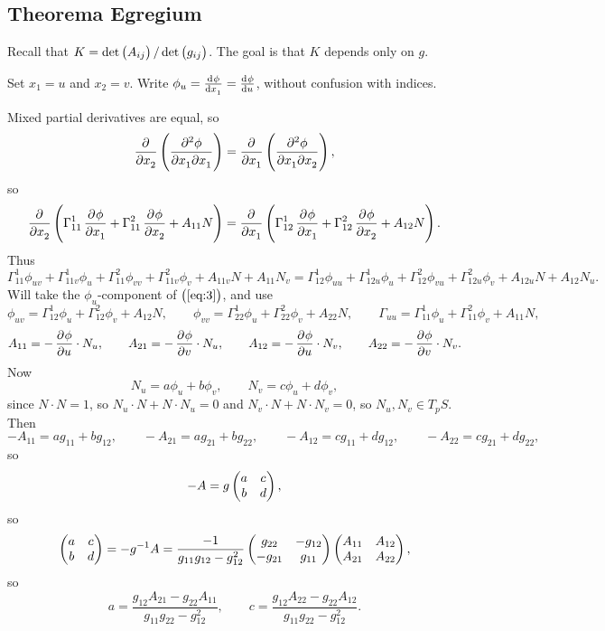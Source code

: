 \pagebreak

\subsection{Theorema Egregium}


Recall that $ K = \det\br{A_{ij}} / \det\br{g_{ij}} $. The goal is that $ K $ depends only on $ g $.

\begin{notation*}
Set $ x_1 = u $ and $ x_2 = v $. Write $ \phi_u = \tod{\phi}{x_1} = \tod{\phi}{u} $, without confusion with indices.
\end{notation*}

Mixed partial derivatives are equal, so
$$ \dpd{}{x_2}\br{\dmd{\phi}{2}{x_1}{}{x_1}{}} = \dpd{}{x_1}\br{\dmd{\phi}{2}{x_1}{}{x_2}{}}, $$
so
$$ \dpd{}{x_2}\br{\Gamma_{11}^1\dpd{\phi}{x_1} + \Gamma_{11}^2\dpd{\phi}{x_2} + A_{11}N} = \dpd{}{x_1}\br{\Gamma_{12}^1\dpd{\phi}{x_1} + \Gamma_{12}^2\dpd{\phi}{x_2} + A_{12}N}. $$
Thus
\begin{equation}
\label{eq:3}
\Gamma_{11}^1\phi_{uv} + \Gamma_{11v}^1\phi_u + \Gamma_{11}^2\phi_{vv} + \Gamma_{11v}^2\phi_v + A_{11v}N + A_{11}N_v = \Gamma_{12}^1\phi_{uu} + \Gamma_{12u}^1\phi_u + \Gamma_{12}^2\phi_{vu} + \Gamma_{12u}^2\phi_v + A_{12u}N + A_{12}N_u.
\end{equation}
Will take the $ \phi_u $-component of $ \br{\ref{eq:3}} $, and use
$$ \phi_{uv} = \Gamma_{12}^1\phi_u + \Gamma_{12}^2\phi_v + A_{12}N, \qquad \phi_{vv} = \Gamma_{22}^1\phi_u + \Gamma_{22}^2\phi_v + A_{22}N, \qquad \Gamma_{uu} = \Gamma_{11}^1\phi_u + \Gamma_{11}^2\phi_v + A_{11}N, $$
$$ A_{11} = -\dpd{\phi}{u} \cdot N_u, \qquad A_{21} = -\dpd{\phi}{v} \cdot N_u, \qquad A_{12} = -\dpd{\phi}{u} \cdot N_v, \qquad A_{22} = -\dpd{\phi}{v} \cdot N_v. $$
Now
$$ N_u = a\phi_u + b\phi_v, \qquad N_v = c\phi_u + d\phi_v, $$
since $ N \cdot N = 1 $, so $ N_u \cdot N + N \cdot N_u = 0 $ and $ N_v \cdot N + N \cdot N_v = 0 $, so $ N_u, N_v \in T_pS $. Then
$$ -A_{11} = ag_{11} + bg_{12}, \qquad -A_{21} = ag_{21} + bg_{22}, \qquad -A_{12} = cg_{11} + dg_{12}, \qquad -A_{22} = cg_{21} + dg_{22}, $$
so
$$ -A = g\begin{pmatrix} a & c \\ b & d \end{pmatrix}, $$
so
$$ \begin{pmatrix} a & c \\ b & d \end{pmatrix} = -g^{-1}A = \dfrac{-1}{g_{11}g_{12} - g_{12}^2}\begin{pmatrix} g_{22} & -g_{12} \\ -g_{21} & g_{11} \end{pmatrix}\begin{pmatrix} A_{11} & A_{12} \\ A_{21} & A_{22} \end{pmatrix}, $$
so
$$ a = \dfrac{g_{12}A_{21} - g_{22}A_{11}}{g_{11}g_{22} - g_{12}^2}, \qquad c = \dfrac{g_{12}A_{22} - g_{22}A_{12}}{g_{11}g_{22} - g_{12}^2}. $$
